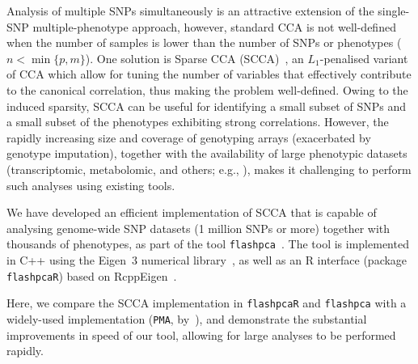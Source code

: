 \documentclass{bioinfo}
\begin{document}
Analysis of multiple SNPs simultaneously is an attractive extension
of the single-SNP multiple-phenotype approach, however, standard
CCA is not well-defined when the number of samples is lower than the
number of SNPs or phenotypes ($n{<}\min\{p, m\}$).  One solution is
Sparse CCA (SCCA)~\citep{Witten2009cshort,Witten2009bshort,Parkhomenko2009},
an $L_1$-penalised variant of CCA which allow for tuning the number of
variables that effectively contribute to the canonical correlation, thus
making the problem well-defined. Owing to the induced sparsity, SCCA can
be useful for identifying a small subset of SNPs and a small subset of the
phenotypes exhibiting strong correlations.  However, the rapidly increasing
size and coverage of genotyping arrays (exacerbated by genotype imputation),
together with the availability of large phenotypic datasets (transcriptomic,
metabolomic, and others; e.g., \citet{Bartel2015,TheGTExConsortium2015}),
makes it challenging to perform such analyses using existing tools.

We have developed an efficient implementation of SCCA that is
capable of analysing genome-wide SNP datasets (1 million SNPs
or more) together with thousands of phenotypes, as part of the tool
\texttt{flashpca}~\citep{Abraham2014}. The tool is implemented in \textsf{C++}
using the Eigen~3 numerical library~\citep{eigenweb}, as well as an \textsf{R}
interface (package \texttt{flashpcaR}) based on RcppEigen~\citep{Bates2013}.

Here, we compare the SCCA implementation in \texttt{flashpcaR} and
\texttt{flashpca} with a widely-used implementation (\texttt{PMA},
by~\citet{Witten2013short}), and demonstrate the substantial improvements
in speed of our tool, allowing for large analyses to be performed rapidly.
\end{document}
